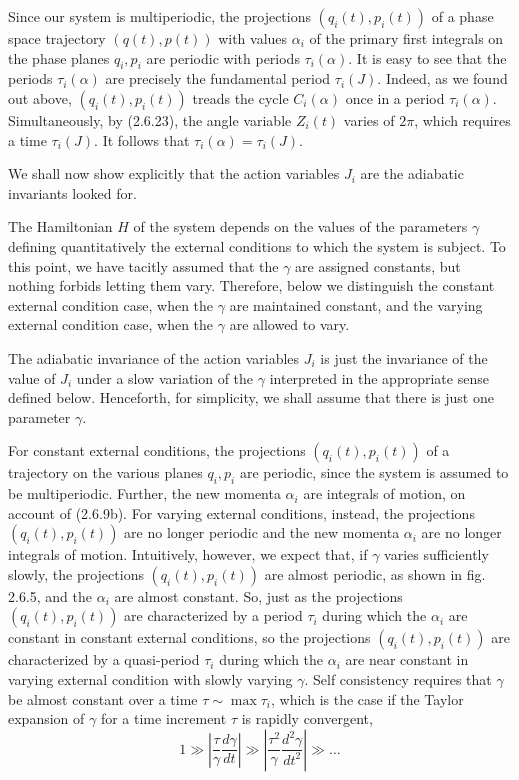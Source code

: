 \documentclass{article}
\begin{document}
Since our system is multiperiodic, the projections $\left(q_{i}(t), p_{i}(t)\right)$ of a phase space trajectory $(q(t), p(t))$ with values $\alpha_{i}$ of the primary first integrals on the phase planes $q_{i}, p_{i}$ are periodic with periods $\tau_{i}(\alpha)$. It is easy to see that the periods $\tau_{i}(\alpha)$ are precisely the fundamental period $\tau_{i}(J)$. Indeed, as we found out above, $\left(q_{i}(t), p_{i}(t)\right)$ treads the cycle $C_{i}(\alpha)$ once in a period $\tau_{i}(\alpha)$. Simultaneously, by (2.6.23), the angle variable $Z_{i}(t)$ varies of $2 \pi$, which requires a time $\tau_{i}(J)$. It follows that $\tau_{i}(\alpha)=\tau_{i}(J)$.

We shall now show explicitly that the action variables $J_{i}$ are the adiabatic invariants looked for.

The Hamiltonian $H$ of the system depends on the values of the parameters
$\gamma$ defining quantitatively the external conditions to which the system is subject. To this point, we have tacitly assumed that the $\gamma$ are assigned constants, but nothing forbids letting them vary. Therefore, below we distinguish the constant external condition case, when the $\gamma$ are maintained constant, and the varying external condition case, when the $\gamma$ are allowed to vary.

The adiabatic invariance of the action variables $J_{i}$ is just the invariance of the value of $J_{i}$ under a slow variation of the $\gamma$ interpreted in the appropriate sense defined below. Henceforth, for simplicity, we shall assume that there is just one parameter $\gamma$.

For constant external conditions, the projections $\left(q_{i}(t), p_{i}(t)\right)$ of a trajectory on the various planes $q_{i}, p_{i}$ are periodic, since the system is assumed to be multiperiodic. Further, the new momenta $\alpha_{i}$ are integrals of motion, on account of (2.6.9b). For varying external conditions, instead, the projections $\left(q_{i}(t), p_{i}(t)\right)$ are no longer periodic and the new momenta $\alpha_{i}$ are no longer integrals of motion. Intuitively, however, we expect that, if $\gamma$ varies sufficiently slowly, the projections $\left(q_{i}(t), p_{i}(t)\right)$ are almost periodic, as shown in fig. 2.6.5, and the $\alpha_{i}$ are almost constant. So, just as the projections $\left(q_{i}(t), p_{i}(t)\right)$ are characterized by a period $\tau_{i}$ during which the $\alpha_{i}$ are constant in constant external conditions, so the projections $\left(q_{i}(t), p_{i}(t)\right)$ are characterized by a quasi-period $\tau_{i}$ during which the $\alpha_{i}$ are near constant in varying external condition with slowly varying $\gamma$. Self consistency requires that $\gamma$ be almost constant over a time $\tau \sim \max \tau_{i}$, which is the case if the Taylor expansion of $\gamma$ for a time increment $\tau$ is rapidly convergent,
$$
\begin{equation*}
1 \gg\left|\frac{\tau}{\gamma} \frac{d \gamma}{d t}\right| \gg\left|\frac{\tau^{2}}{\gamma} \frac{d^{2} \gamma}{d t^{2}}\right| \gg \ldots \tag{2.6.50}
\end{equation*}
$$
\end{document}

